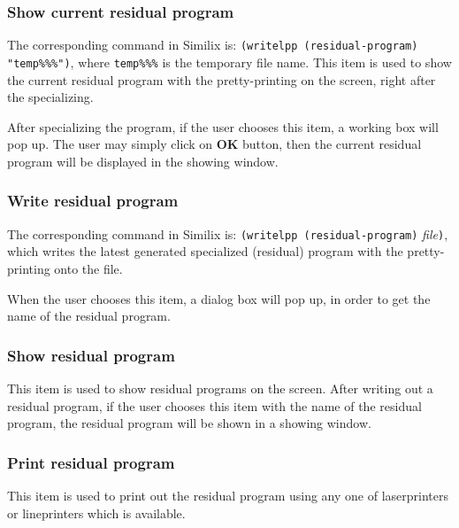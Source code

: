 \begin{sloppypar}
\subsubsection{Show current residual program}
\label{subsubsec-show-cur-res-prog}

The corresponding command in Similix is: {\tt (writelpp
(residual-program) "temp\%\%\%")}, where {\tt temp\%\%\%} is the
temporary file name.  This item is used to show the current residual
program with the pretty-printing on the screen, right after the
specializing.

   After specializing the program, if the user chooses this item, a
working box will pop up. The user may simply click on {\bf OK} button,
then the current residual program will be displayed in the showing
window.



\subsubsection{Write residual program}
\label{subsubsec-write-res-prog}

The corresponding command in Similix is: {\tt (writelpp
(residual-program)} {\it file}{\tt )}, which writes the latest
generated specialized (residual) program with the pretty-printing onto
the file.

   When the user chooses this item, a dialog box will pop up, in order
to get the name of the residual program.



\subsubsection{Show residual program}
\label{subsubsec-show-res-prog}

This item is used to show residual programs on the screen. After
writing out a residual program, if the user chooses this item with the
name of the residual program, the residual program will be shown in a
showing window.



\subsubsection{Print residual program}
\label{subsubsec-print-res-prog}

This item is used to print out the residual program using any one of
laserprinters or lineprinters which is available.


\end{sloppypar}
